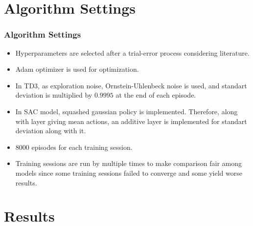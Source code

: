 \documentclass{beamer}
\begin{document}

\section{Algorithm Settings}
\begin{frame}
\frametitle{Algorithm Settings}
\begin{itemize}
	\item Hyperparameters are selected after a trial-error process considering literature. 
	\item Adam optimizer is used for optimization. 
	\item In TD3, as exploration noise, Ornstein-Uhlenbeck noise is used, and standart deviation is multiplied  by $0.9995$ at the end of each episode. 
	\item In SAC model, squashed gaussian policy is implemented. Therefore, along with layer giving mean actions, an additive layer is implemented for standart deviation along with it. 
	\item 8000 episodes for each training session. 
	\item Training sessions are run by multiple times to make comparison fair among models since some training sessions failed to converge and some yield worse results.
\end{itemize}
\end{frame}


\section{Results}
\end{document}
